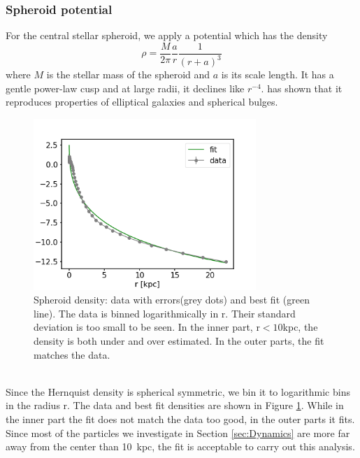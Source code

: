 \subsubsection{Spheroid potential}\label{subsubsec:spher_pot}
For the central stellar spheroid, we apply a \citet{Hernquistprofile} potential which has the density 
\begin{equation}
    \rho = \frac{M}{2\pi}\frac{a}{r}\frac{1}{(r+a)^3}
\end{equation}
where $M$ is the stellar mass of the spheroid and $a$ is its scale length. It has a gentle power-law cusp and at large radii, it declines like $r^{-4}$. \citet{Hernquistprofile} has shown that it reproduces properties of elliptical galaxies and spherical bulges. 
\\
\begin{figure}
\captionsetup{format=plain}
    \centering
    \includegraphics[width=0.75\textwidth]{plots/Auriga/spheroid_density_fit_snap_127.png}
    \caption{Spheroid density: data with errors(grey dots) and best fit (green line). The data is binned logarithmically in r. Their standard deviation is too small to be seen. In the inner part, r$<10$kpc, the density is both under and over estimated. In the outer parts, the fit matches the data.}
    \label{fig:spheroid_fit}
\end{figure}
\\Since the Hernquist density is spherical symmetric, we bin it to logarithmic bins in the radius r. The data and best fit densities are shown in Figure \ref{fig:spheroid_fit}. While in the inner part the fit does not match the data too good, in the outer parts it fits. Since most of the particles we investigate in Section \ref{sec:Dynamics} are more far away from the center than \SI{10}{kpc}, the fit is acceptable to carry out this analysis.


